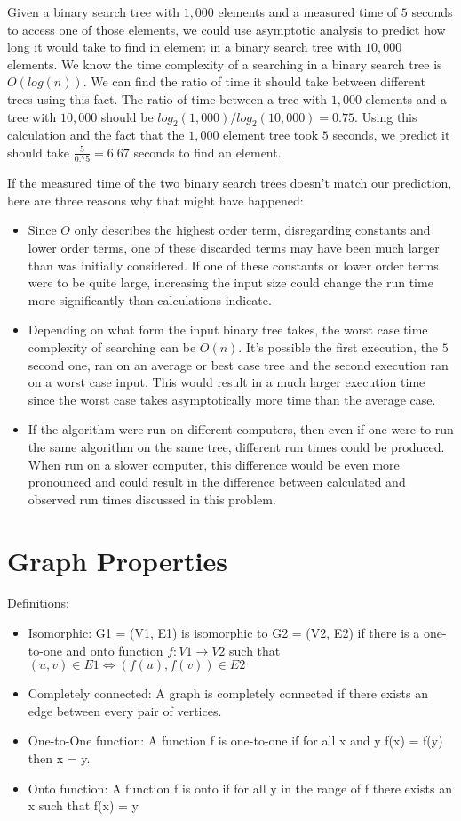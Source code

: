\documentclass{article}
\begin{document}
Given a binary search tree with $1,000$ elements and a measured time of $5$ seconds to access one of those elements, we could use asymptotic analysis to predict how long it would take to find in element in a binary search tree with $10,000$ elements.
We know the time complexity of a searching in a binary search tree is $O(log(n))$. We can find the ratio of time it should take between different trees using this fact. The ratio of time between a tree with $1,000$ elements and a tree with $10,000$ should be $log_2(1,000)/log_2(10,000) = 0.75$. Using this calculation and the fact that the $1,000$ element tree took $5$ seconds, we predict it should take $\frac{5}{0.75} = 6.67$ seconds to find an element.

If the measured time of the two binary search trees doesn't match our prediction, here are three reasons why that might have happened:
\begin{itemize}
  \item Since $O$ only describes the highest order term, disregarding constants and lower order terms, one of these discarded terms may have been much larger than was initially considered. If one of these constants or lower order terms were to be quite large, increasing the input size could change the run time more significantly than calculations indicate.
  \item Depending on what form the input binary tree takes, the worst case time complexity of searching can be $O(n)$. It's possible the first execution, the $5$ second one, ran on an average or best case tree and the second execution ran on a worst case input. This would result in a much larger execution time since the worst case takes asymptotically more time than the average case.
  \item If the algorithm were run on different computers, then even if one were to run the same algorithm on the same tree, different run times could be produced. When run on a slower computer, this difference would be even more pronounced and could result in the difference between calculated and observed run times discussed in this problem.
\end{itemize}

\section{Graph Properties}


Definitions:
\begin{itemize}
\item Isomorphic: G1 = (V1, E1) is isomorphic to G2 = (V2, E2) if there is a
one-to-one and onto function $f : V1 \rightarrow V2$ such that
$(u, v) \in E1 \iff (f(u), f(v)) \in E2$
\item Completely connected: A graph is completely connected if there exists an edge between every pair of vertices.
\item One-to-One function: A function f is one-to-one if for all x and y f(x) = f(y) then x = y.
\item Onto function: A function f is onto if for all y in the range of f there exists an x such that f(x) = y
\end{itemize}
\end{document}
